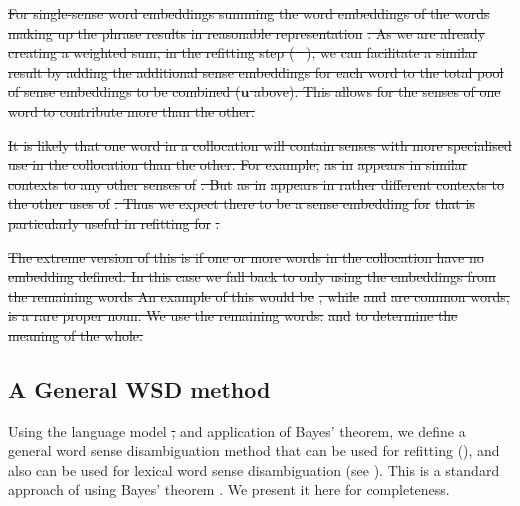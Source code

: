 \documentclass{article} %
\def\parencite{\cite} %
\renewcommand{\u}{\mathbf{u}}
\newcommand{\wordquote}[1]{\enquote{\texttt{#1}}}
\providecommand{\DIFdel}[1]{{\protect\color{red}\sout{#1}}}                      %
\providecommand{\DIFaddbegin}{} %
\providecommand{\DIFaddend}{} %
\providecommand{\DIFdelbegin}{} %
\providecommand{\DIFdelend}{} %
\begin{document}
\DIFdel{For single-sense word embeddings  summing the word embeddings of the words making up the phrase results in reasonable representation }%
\DIFdel{.
As we are already creating a weighted sum, in the refitting step (\mbox{%
\Cref{eq:synth}}%
), we can facilitate a similar result by adding the additional sense embeddings for each word to the total pool of sense embeddings to be combined ($\u$ above). This allows for the senses of one word to contribute more than the other.
}%

\DIFdel{It is likely that one word in a collocation will contain senses with more specialised use in the collocation than the other.
For example, }%
\DIFdel{as in }%
\DIFdel{appears in similar contexts to any other senses of }%
\DIFdel{.
But }%
\DIFdel{as in }%
\DIFdel{appears in rather different contexts to the other uses of }%
\DIFdel{. Thus we expect there to be a sense embedding for }%
\DIFdel{that is particularly useful in refitting for }%
\DIFdel{.
}%

\DIFdel{The extreme version of this is if one or more words in the collocation have no embedding defined. In this case we fall back to only using the embeddings from the remaining words An example of this would be }%
\DIFdel{, while }%
\DIFdel{and }%
\DIFdel{are common words, }%
\DIFdel{is a rare proper noun. We use the remaining words: }%
\DIFdel{and }%
\DIFdel{to determine the meaning of the whole.
}%

\DIFdelend \subsection{A General WSD method} \label{generalwsd}
Using the language model \DIFdelbegin \DIFdel{, }\DIFdelend and application of Bayes' theorem, we define a general word sense disambiguation method that can be used for refitting (), and also can be used for lexical word sense disambiguation (see ). This is a standard approach of using Bayes' theorem \DIFdelbegin %
\DIFdelend \DIFaddbegin \parencite{tian2014probabilistic,AdaGrams}\DIFaddend . We present it here for completeness.
\end{document}

